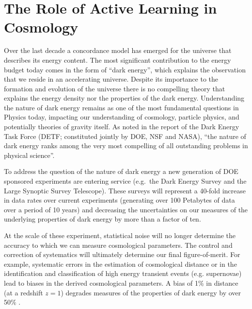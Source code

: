 \documentclass[useAMS,usenatbib,tightenlines,11pt,preprint]{aastex}
\begin{document}

\section{The Role of Active Learning in Cosmology}

Over the last decade a concordance model has emerged for the universe
that describes its energy content. The most significant contribution
to the energy budget today comes in the form of ``dark energy'', which
explains the observation that we reside in an accelerating
universe. Despite its importance to the formation and evolution of the
universe there is no compelling theory that explains the energy
density nor the properties of the dark energy. Understanding the
nature of dark energy remains as one of the most fundamental questions
in Physics today, impacting our understanding of cosmology, particle
physics, and potentially theories of gravity itself.  As noted in the 
report of the Dark Energy Task Force (DETF; constituted jointly by
DOE, NSF and NASA), ``the nature of dark energy ranks among the very
most compelling of all outstanding problems in physical science''.


To address the question of the nature of dark energy a new generation
of DOE sponsored experiments are entering service (e.g.\ the Dark
Energy Survey and the
Large Synoptic Survey Telescope).  These
surveys will represent a 40-fold increase in data rates over current
experiments (generating over 100 Petabytes of data over a period of 10
years) and decreasing the uncertainties on our measures of the
underlying properties of dark energy by more than a factor of ten.


At the scale of these experiment, statistical noise will no longer
determine the accuracy
 to which we can measure cosmological
parameters. The control and
 correction of systematics will
ultimately determine our final
 figure-of-merit. For example,
systematic errors in the estimation of cosmological distance or in the
identification and classification of high energy transient events
(e.g. supernovae) lead to biases in the derived cosmological
parameters. A bias of 1\% in distance (at a redshift $z=1$) degrades
measures of the properties of dark energy by over 50\%
\cite{kitching,huterer2006,nakajima2011}.
\end{document}
